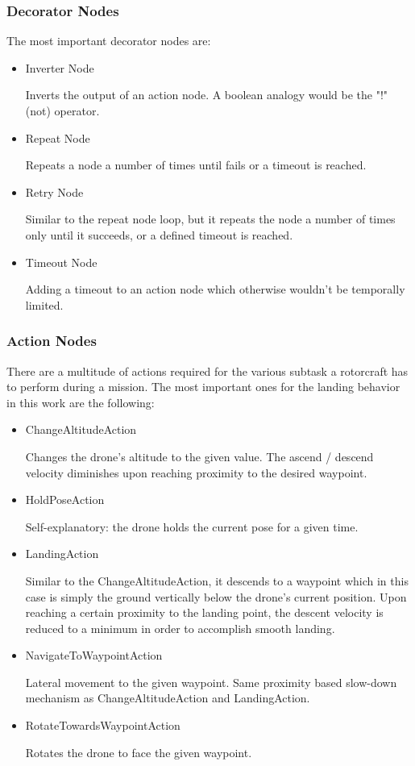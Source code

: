 \subsubsection{Decorator Nodes}\label{subsubsec:decorator_nodes}

The most important decorator nodes are:

\begin{itemize}
    \item Inverter Node
    
    Inverts the output of an action node. A boolean analogy would be the "!" (not) operator.
    \item Repeat Node
    
    Repeats a node a number of times until fails or a timeout is reached. 
    \item Retry Node
    
    Similar to the repeat node loop, but it repeats the node a number of times only until it succeeds, or a defined timeout is reached.
    \item Timeout Node
    
    Adding a timeout to an action node which otherwise wouldn't be temporally limited.
\end{itemize}

\subsubsection{Action Nodes}\label{subsubsec:setup:action_nodes}

There are a multitude of actions required for the various subtask a rotorcraft has to perform during a mission. The most important ones for the landing behavior in this work are the following:

\begin{itemize}
    \item ChangeAltitudeAction
    
    Changes the drone's altitude to the given value. The ascend / descend velocity diminishes upon reaching proximity to the desired waypoint.
    \item HoldPoseAction
    
    Self-explanatory: the drone holds the current pose for a given time.
    \item LandingAction
    
    Similar to the ChangeAltitudeAction, it descends to a waypoint which in this case is simply the ground vertically below the drone's current position. Upon reaching a certain proximity to the landing point, the descent velocity is reduced to a minimum in order to accomplish smooth landing.
    \item NavigateToWaypointAction
    
    Lateral movement to the given waypoint. Same proximity based slow-down mechanism as ChangeAltitudeAction and LandingAction.
    \item RotateTowardsWaypointAction
    
    Rotates the drone to face the given waypoint.
\end{itemize}








